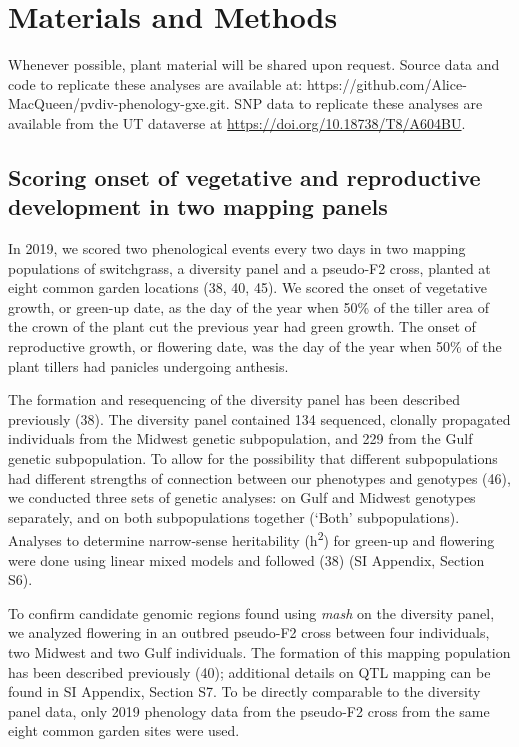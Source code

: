 \documentclass[
  9pt,
  twocolumn,
  twoside]{pnas-new}
\begin{document}
\section{Materials and Methods}\label{materials-and-methods}

Whenever possible, plant material will be shared upon request. Source
data and code to replicate these analyses are available at:
https://github.com/Alice-MacQueen/pvdiv-phenology-gxe.git. SNP data to
replicate these analyses are available from the UT dataverse at
\url{https://doi.org/10.18738/T8/A604BU}.

\subsection{Scoring onset of vegetative and reproductive development in
two mapping
panels}\label{scoring-onset-of-vegetative-and-reproductive-development-in-two-mapping-panels}

In 2019, we scored two phenological events every two days in two mapping
populations of switchgrass, a diversity panel and a pseudo-F2 cross,
planted at eight common garden locations (38, 40, 45). We scored the
onset of vegetative growth, or green-up date, as the day of the year
when 50\% of the tiller area of the crown of the plant cut the previous
year had green growth. The onset of reproductive growth, or flowering
date, was the day of the year when 50\% of the plant tillers had
panicles undergoing anthesis.

The formation and resequencing of the diversity panel has been described
previously (38). The diversity panel contained 134 sequenced, clonally
propagated individuals from the Midwest genetic subpopulation, and 229
from the Gulf genetic subpopulation. To allow for the possibility that
different subpopulations had different strengths of connection between
our phenotypes and genotypes (46), we conducted three sets of genetic
analyses: on Gulf and Midwest genotypes separately, and on both
subpopulations together (`Both' subpopulations). Analyses to determine
narrow-sense heritability (h\textsuperscript{2}) for green-up and
flowering were done using linear mixed models and followed (38) (SI
Appendix, Section S6).

To confirm candidate genomic regions found using \emph{mash} on the
diversity panel, we analyzed flowering in an outbred pseudo-F2 cross
between four individuals, two Midwest and two Gulf individuals. The
formation of this mapping population has been described previously (40);
additional details on QTL mapping can be found in SI Appendix, Section
S7. To be directly comparable to the diversity panel data, only 2019
phenology data from the pseudo-F2 cross from the same eight common
garden sites were used.
\end{document}
